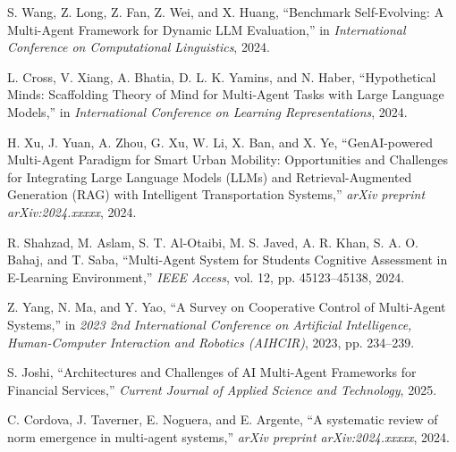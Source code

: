 \documentclass[conference]{IEEEtran}
\begin{document}
\begin{thebibliography}{20}
S. Wang, Z. Long, Z. Fan, Z. Wei, and X. Huang, ``Benchmark Self-Evolving: A Multi-Agent Framework for Dynamic LLM Evaluation,'' in \textit{International Conference on Computational Linguistics}, 2024.

L. Cross, V. Xiang, A. Bhatia, D. L. K. Yamins, and N. Haber, ``Hypothetical Minds: Scaffolding Theory of Mind for Multi-Agent Tasks with Large Language Models,'' in \textit{International Conference on Learning Representations}, 2024.

H. Xu, J. Yuan, A. Zhou, G. Xu, W. Li, X. Ban, and X. Ye, ``GenAI-powered Multi-Agent Paradigm for Smart Urban Mobility: Opportunities and Challenges for Integrating Large Language Models (LLMs) and Retrieval-Augmented Generation (RAG) with Intelligent Transportation Systems,'' \textit{arXiv preprint arXiv:2024.xxxxx}, 2024.

R. Shahzad, M. Aslam, S. T. Al-Otaibi, M. S. Javed, A. R. Khan, S. A. O. Bahaj, and T. Saba, ``Multi-Agent System for Students Cognitive Assessment in E-Learning Environment,'' \textit{IEEE Access}, vol. 12, pp. 45123--45138, 2024.

Z. Yang, N. Ma, and Y. Yao, ``A Survey on Cooperative Control of Multi-Agent Systems,'' in \textit{2023 2nd International Conference on Artificial Intelligence, Human-Computer Interaction and Robotics (AIHCIR)}, 2023, pp. 234--239.

S. Joshi, ``Architectures and Challenges of AI Multi-Agent Frameworks for Financial Services,'' \textit{Current Journal of Applied Science and Technology}, 2025.

C. Cordova, J. Taverner, E. Noguera, and E. Argente, ``A systematic review of norm emergence in multi-agent systems,'' \textit{arXiv preprint arXiv:2024.xxxxx}, 2024.

\end{thebibliography}
\end{document}
